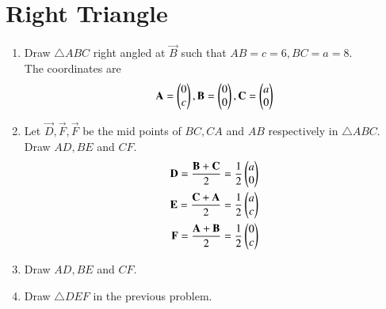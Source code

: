 \documentclass[journal,12pt,twocolumn]{IEEEtran}
\renewcommand\thesection{\arabic{section}}
\begin{document}
\section{Right Triangle}
\begin{enumerate}[label=\thesection.\arabic*
,ref=\thesection.\theenumi]
%
\item Draw $\triangle ABC$  right angled at $\vec{B}$ such that $AB = c =6, BC = a =8$.
\\
\solution The coordinates are
\begin{align}
\label{eq:rt_tang_pair}
\mathbf{A}=\begin{pmatrix}0 \\ c\end{pmatrix}
,
\mathbf{B}=\begin{pmatrix}0 \\ 0\end{pmatrix}
,
\mathbf{C}=\begin{pmatrix}a \\ 0\end{pmatrix}
\end{align}
\item Let $\vec{D}, \vec{F}, \vec{F}$ be the mid points of $BC,CA$ and $AB$ respectively in $\triangle ABC$. Draw $AD,BE$ and $CF$.
\\
\solution 
\begin{align}
\label{eq:rt_tang_pair_def}
\mathbf{D} = \frac{\mathbf{B}+\mathbf{C}}{2} = \frac{1}{2}\begin{pmatrix}a \\ 0\end{pmatrix}
\\
\mathbf{E} = \frac{\mathbf{C}+\mathbf{A}}{2} = \frac{1}{2}\begin{pmatrix}a \\ c\end{pmatrix}
\\
\mathbf{F} = \frac{\mathbf{A}+\mathbf{B}}{2} = \frac{1}{2}\begin{pmatrix}0 \\ c\end{pmatrix}
\end{align}
\item  Draw $AD, BE$ and $CF$.
\item Draw $\triangle DEF$ in the previous problem.

\end{enumerate}
\end{document}
